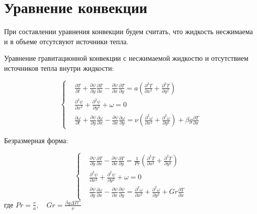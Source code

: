 \documentclass[a4paper, 12pt]{article}
\newcommand{\der}[2]{\frac{\partial {#1}}{\partial {#2}}}
\newcommand{\dder}[2]{\frac{\partial^2 {#1}}{\partial {#2}^2}}
\begin{document}
\begin{center}
\end{center}

  \pagebreak

  \section{Уравнение конвекции}
    При составлении уравнения конвекции будем считать, что жидкость несжимаема и
    в объеме отсутсвуют источники тепла.

    Уравнение гравитационной конвекции с несжимаемой жидкостю и отсутствием
    источников тепла внутри жидкости:

    $$
      \left\{
        \begin{aligned}
          &\der{T}{t} + \der{\psi}{y} \der{T}{x} - \der{\psi}{x} \der{T}{y} =
            a \left( \dder{T}{x} + \dder{T}{y} \right)
          \\
          &\dder{\psi}{x} + \dder{\psi}{y} + \omega = 0
          \\
          &\der{\omega}{t} + \der{\psi}{y} \der{\omega}{x} - \der{\psi}{x}
            \der{\omega}{y} = \nu \left(
              \dder{\omega}{x} + \dder{\omega}{y}
            \right) + \beta g \der{T}{x}
        \end{aligned}
      \right.
    $$

    Безразмерная форма:

    $$
      \left\{
        \begin{aligned}
          &\der{\psi}{y} \der{T}{x} - \der{\psi}{x} \der{T}{y} = \frac{1}{Pr}
            \left( \dder{T}{x} + \dder{T}{y} \right)
          \\
          &\dder{\psi}{x} + \dder{\psi}{y} + \omega = 0
          \\
          &\der{\psi}{y} \der{\omega}{x} - \der{\psi}{x} \der{\psi}{y} =
            \dder{\omega}{x} + \dder{\omega}{y} + Gr \der{T}{x}
        \end{aligned}
      \right.
    $$
    где $Pr = \frac{v}{a}, \quad Gr = \frac{\beta g \Delta T l^{3}}{\nu}$
  \pagebreak
\end{document}

